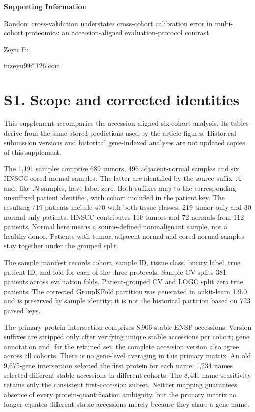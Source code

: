 \documentclass[11pt]{article}
\begin{document}
\begin{center}
{\Large\bfseries Supporting Information}\par
\vspace{0.5em}
{\large Random cross-validation understates cross-cohort calibration error in
multi-cohort proteomics: an accession-aligned evaluation-protocol contrast}\par
\vspace{0.5em}
Zeyu Fu\par
\href{mailto:fuzeyu99@126.com}{fuzeyu99@126.com}
\end{center}

\section*{S1. Scope and corrected identities}

This supplement accompanies the accession-aligned six-cohort analysis.
Its tables derive from the same stored predictions used by the article
figures. Historical submission versions and historical gene-indexed
analyses are not updated copies of this supplement.

The 1,191 samples comprise 689 tumors, 496 adjacent-normal samples and
six HNSCC cored-normal samples. The latter are identified by the source
suffix \texttt{.C} and, like \texttt{.N} samples, have label zero.
Both suffixes map to the corresponding unsuffixed patient identifier,
with cohort included in the patient key. The resulting 719 patients
include 470 with both tissue classes, 219 tumor-only and 30 normal-only
patients. HNSCC contributes 110 tumors and 72 normals from 112 patients.
Normal here means a source-defined nonmalignant sample, not a healthy
donor. Patients with tumor, adjacent-normal and cored-normal samples
stay together under the grouped split.

The sample manifest records cohort, sample ID, tissue class, binary
label, true patient ID, and fold for each of the three protocols.
Sample CV splits 381 patients across evaluation folds. Patient-grouped
CV and LOGO split zero true patients. The corrected GroupKFold
partition was generated in scikit-learn 1.9.0 and is preserved by sample
identity; it is not the historical partition based on 723 parsed keys.

The primary protein intersection comprises 8,906 stable ENSP accessions.
Version suffixes are stripped only after verifying unique stable
accessions per cohort; gene annotation and, for the retained set, the
complete accession version also agree across all cohorts. There is no
gene-level averaging in this primary matrix. An old 9,675-gene
intersection selected the first protein for each name; 1,234 names
selected different stable accessions in different cohorts. The
8,441-name sensitivity retains only the consistent first-accession
subset. Neither mapping guarantees absence of every protein-quantification
ambiguity, but the primary matrix no longer equates different stable
accessions merely because they share a gene name.
\end{document}
